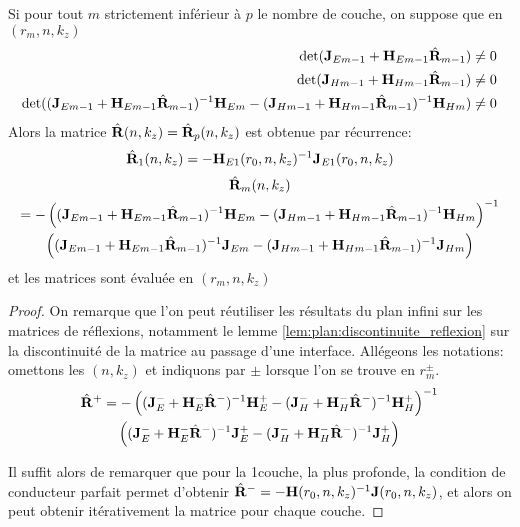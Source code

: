     \begin{prop}
      Si pour tout \(m\) strictement inférieur à \(p\) le nombre de couche, on suppose que en \((r_m,n,k_z)\)
      \begin{align*}
          \det(\mathbf{J}_{Em-1} + \mathbf{H}_{Em-1}\hat{\mathbf{R}}_{m-1}) \not = 0
          \\
          \det(\mathbf{J}_{Hm-1} + \mathbf{H}_{Hm-1}\hat{\mathbf{R}}_{m-1}) \not = 0
          \\
          \det((\mathbf{J}_{Em-1} + \mathbf{H}_{Em-1}\hat{\mathbf{R}}_{m-1})^{-1}\mathbf{H}_{Em} - (\mathbf{J}_{Hm-1} + \mathbf{H}_{Hm-1}\hat{\mathbf{R}}_{m-1})^{-1}\mathbf{H}_{Hm}) \not = 0
      \end{align*}
      Alors la matrice \(\hat{\mathbf{R}}(n,k_z)=\hat{\mathbf{R}}_p(n,k_z)\) est obtenue par récurrence:
      \begin{equation*}
        \hat{\mathbf{R}}_1(n,k_z) = - \mathbf{H}_{E1}(r_0,n,k_z)^{-1}\mathbf{J}_{E1}(r_0,n,k_z)
      \end{equation*}
      \begin{multline*}
        \hat{\mathbf{R}}_m(n,k_z) \\
        = - \left((\mathbf{J}_{Em-1} + \mathbf{H}_{Em-1}\hat{\mathbf{R}}_{m-1})^{-1}\mathbf{H}_{Em} - (\mathbf{J}_{Hm-1} + \mathbf{H}_{Hm-1}\hat{\mathbf{R}}_{m-1})^{-1}\mathbf{H}_{Hm}\right)^{-1}
        \\
        \left((\mathbf{J}_{Em-1} + \mathbf{H}_{Em-1}\hat{\mathbf{R}}_{m-1})^{-1}\mathbf{J}_{Em} - (\mathbf{J}_{Hm-1} + \mathbf{H}_{Hm-1}\hat{\mathbf{R}}_{m-1})^{-1}\mathbf{J}_{Hm}\right)
      \end{multline*}
      et les matrices sont évaluée en \((r_m,n,k_z)\)
    \end{prop}
    \begin{proof}
      On remarque que l'on peut réutiliser les résultats du plan infini sur les matrices de réflexions, notamment le lemme \ref{lem:plan:discontinuite_reflexion} sur la discontinuité de la matrice au passage d'une interface. Allégeons les notations: omettons les \((n,k_z)\) et indiquons par \(\pm\) lorsque l'on se trouve en \(r_m^\pm\).
      \begin{multline}
        \hat{\mathbf{R}}^+ = - \left((\mathbf{J}_E^- + \mathbf{H}_E^-\hat{\mathbf{R}}^-)^{-1}\mathbf{H}_E^+ - (\mathbf{J}_H^- + \mathbf{H}_H^-\hat{\mathbf{R}}^-)^{-1}\mathbf{H}_H^+\right)^{-1}
        \\
        \left((\mathbf{J}_E^- + \mathbf{H}_E^-\hat{\mathbf{R}}^-)^{-1}\mathbf{J}_E^+ - (\mathbf{J}_H^- + \mathbf{H}_H^-\hat{\mathbf{R}}^-)^{-1}\mathbf{J}_H^+\right)
      \end{multline}

      Il suffit alors de remarquer que pour la 1\iere couche, la plus profonde, la condition de conducteur parfait permet d'obtenir \(\hat{\mathbf{R}}^- = - \mathbf{H}(r_0,n,k_z)^{-1}\mathbf{J}(r_0,n,k_z)\), et alors on peut obtenir itérativement la matrice pour chaque couche.
    \end{proof}

